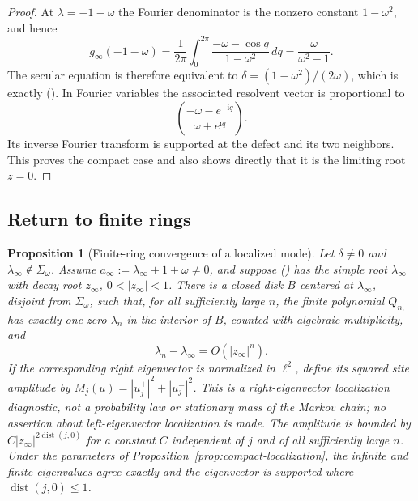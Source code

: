 \documentclass[twoside,10pt]{article}
\numberwithin{equation}{section}
\theoremstyle{slbody}
\newtheorem{proposition}[theorem]{Proposition}
\theoremstyle{definition}
\theoremstyle{remark}
\newcommand{\ii}{\mathrm i}
\renewcommand{\eqref}[1]{%
  \textup{{\normalfont(\oldstylenums{\ref{#1}}}\normalfont)}}
\begin{document}
\begin{proof}
At $\lambda=-1-\omega$ the Fourier denominator is the nonzero constant
$1-\omega^2$, and hence
\[
 g_\infty(-1-\omega)
 =\frac1{2\pi}\int_0^{2\pi}
     \frac{-\omega-\cos q}{1-\omega^2}\,dq
 =\frac{\omega}{\omega^2-1}.
\]
The secular equation is therefore equivalent to
$\delta=(1-\omega^2)/(2\omega)$, which is exactly
\eqref{eq:compact-localization}.  In Fourier variables the associated
resolvent vector is proportional to
\[
 \binom{-\omega-e^{-\ii q}}{\omega+e^{\ii q}}.
\]
Its inverse Fourier transform is supported at the defect and its two
neighbors.  This proves the compact case and also shows directly that
it is the limiting root $z=0$.
\end{proof}

\subsection{Return to finite rings}

\begin{proposition}[Finite-ring convergence of a localized mode]
\label{prop:localized-convergence}
Let $\delta\ne0$ and $\lambda_\infty\notin\Sigma_\omega$.  Assume
$a_\infty:=\lambda_\infty+1+\omega\ne0$, and suppose
\eqref{eq:localization-secular} has the simple root $\lambda_\infty$ with
decay root
$z_\infty$, $0<|z_\infty|<1$.  There is a closed disk $B$ centered at
$\lambda_\infty$, disjoint from $\Sigma_\omega$, such that, for all
sufficiently large $n$, the finite polynomial $Q_{n,-}$ has exactly one
zero $\lambda_n$ in the interior of $B$, counted with algebraic
multiplicity, and
\[
 \lambda_n-\lambda_\infty=O(|z_\infty|^n).
\]
If the corresponding right eigenvector is normalized in $\ell^2$, define
its squared site amplitude by
$M_j(u)=|u_j^+|^2+|u_j^-|^2$.  This is a right-eigenvector localization
diagnostic, not a probability law or stationary mass of the Markov chain;
no assertion about left-eigenvector localization is made.  The amplitude
is bounded by $C|z_\infty|^{2\operatorname{dist}(j,0)}$ for a constant $C$
independent of $j$ and of all sufficiently large $n$.
Under the parameters of Proposition~\ref{prop:compact-localization}, the
infinite and finite eigenvalues agree exactly and the eigenvector is supported
where $\operatorname{dist}(j,0)\le1$.
\end{proposition}
\end{document}
